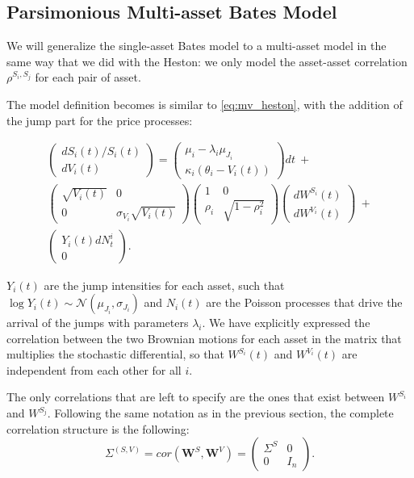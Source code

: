 \subsection{Parsimonious Multi-asset Bates Model}
We will generalize the single-asset Bates model to a multi-asset model in the same way that we did with the Heston: we only model the asset-asset correlation $\rho^{S_i, S_j}$ for each pair of asset.

The model definition becomes is similar to \eqref{eq:mv_heston}, with the addition of the jump part for the price processes:

\begin{multline}
\begin{pmatrix}
dS_i(t) / S_i(t)\\
dV_i(t)
\end{pmatrix}
= \begin{pmatrix}
\mu_i - \lambda_i \mu_{J_i}\\
\kappa_i (\theta_i - V_i(t))
\end{pmatrix}
dt  \:+\\ 
\begin{pmatrix}
\sqrt{V_i(t)} & 0 \\
0 & \sigma_{V_i} \sqrt{V_i(t)} 
\end{pmatrix}
\begin{pmatrix}
1 & 0 \\
\rho_i & \sqrt{1-\rho_i^2} 
\end{pmatrix}
\begin{pmatrix}
dW^{S_i}(t)\\
dW^{V_i }(t)
\end{pmatrix}
\: + \\
\begin{pmatrix}
Y_i(t) dN^i_t  \\
0   
\end{pmatrix}.
\end{multline}

$Y_i(t)$ are the jump intensities for each asset, such that $\log Y_i(t) \sim \mathcal{N}(\mu_{J_i}, \sigma_{J_i})$ and $N_i(t)$ are the Poisson processes that drive the arrival of the jumps with parameters $\lambda_i$.
We have explicitly expressed the correlation between the two Brownian motions for each asset in the matrix that multiplies the stochastic differential, so that $W^{S_i}(t)$ and $W^{V_i}(t)$ are independent from each other for all $i$.

The only correlations that are left to specify are the ones that exist between $W^{S_i}$ and $W^{S_j}$. Following the same notation as in the previous section, the complete correlation structure is the following:
\begin{equation}
\label{eq:bates_cor}
\Sigma^{(S,V)} = cor(\boldsymbol{W}^{S}, \boldsymbol{W}^{V}) = \begin{pmatrix}
\Sigma^{S} & 0 \\
0& I_n
\end{pmatrix}.
\end{equation}

